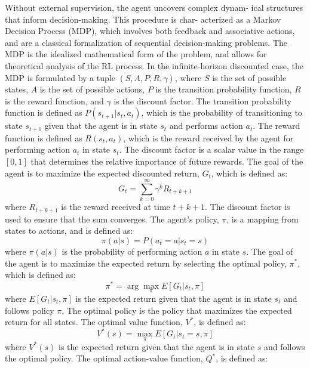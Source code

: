 \documentclass[conference]{IEEEtran}
\begin{document}
Without external supervision, the agent uncovers complex dynam- ical structures that inform decision-making. This procedure is char- acterized as a Markov Decision Process (MDP), which involves both feedback and associative actions, and are a classical formalization of sequential decision-making problems. The MDP is the idealized mathematical form of the problem, and allows for theoretical analysis of the RL process. In the infinite-horizon discounted case, the MDP is formulated by a tuple \((S, A, P, R, \gamma)\), where \(S\) is the set of possible states, \(A\) is the set of possible actions, \(P\) is the transition probability function, \(R\) is the reward function, and \(\gamma\) is the discount factor. The transition probability function is defined as \(P(s_{t+1}|s_t, a_t)\), which is the probability of transitioning to state \(s_{t+1}\) given that the agent is in state \(s_t\) and performs action \(a_t\). The reward function is defined as \(R(s_t, a_t)\), which is the reward received by the agent for performing action \(a_t\) in state \(s_t\). The discount factor is a scalar value in the range \([0, 1]\) that determines the relative importance of future rewards. The goal of the agent is to maximize the expected discounted return, \(G_t\), which is defined as:
\begin{equation}
    G_t = \sum_{k=0}^{\infty}\gamma^kR_{t+k+1}
\end{equation}
where \(R_{t+k+1}\) is the reward received at time \(t+k+1\). The discount factor is used to ensure that the sum converges. The agent's policy, \(\pi\), is a mapping from states to actions, and is defined as:
\begin{equation}
    \pi(a|s) = P(a_t = a|s_t = s)
\end{equation}
where \(\pi(a|s)\) is the probability of performing action \(a\) in state \(s\). The goal of the agent is to maximize the expected return by selecting the optimal policy, \(\pi^*\), which is defined as:
\begin{equation}
    \pi^* = \arg\max_{\pi}E[G_t|s_t, \pi]
\end{equation}
where \(E[G_t|s_t, \pi]\) is the expected return given that the agent is in state \(s_t\) and follows policy \(\pi\). The optimal policy is the policy that maximizes the expected return for all states. The optimal value function, \(V^*\), is defined as:
\begin{equation}
    V^*(s) = \max_{\pi}E[G_t|s_t = s, \pi]
\end{equation}
where \(V^*(s)\) is the expected return given that the agent is in state \(s\) and follows the optimal policy. The optimal action-value function, \(Q^*\), is defined as:
\end{document}
